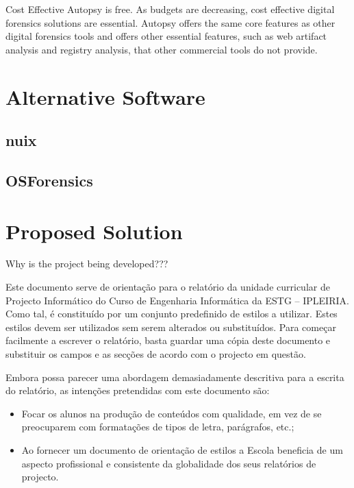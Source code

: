 Cost Effective
Autopsy is free. As budgets are decreasing, cost effective digital forensics solutions are essential. Autopsy offers the same core features as other digital forensics tools and offers other essential features, such as web artifact analysis and registry analysis, that other commercial tools do not provide.

\section{Alternative Software}


\subsection{nuix}


\subsection{OSForensics}


\section{Proposed Solution}

Why is the project being developed???

\pagebreak

Este documento serve de orientação para o relatório da unidade curricular de Projecto Informático do Curso de Engenharia Informática da ESTG – IPLEIRIA. Como tal, é constituído por um conjunto predefinido de estilos a utilizar. Estes estilos devem ser utilizados sem serem alterados ou substituídos. Para começar facilmente a escrever o relatório, basta guardar uma cópia deste documento e substituir os campos e as secções de acordo com o projecto em questão.

Embora possa parecer uma abordagem demasiadamente descritiva para a escrita do relatório, as intenções pretendidas com este documento são:

\begin{itemize}
 \item Focar os alunos na produção de conteúdos com qualidade, em vez de se preocuparem com formatações de tipos de letra, parágrafos, etc.;
 \item Ao fornecer um documento de orientação de estilos a Escola beneficia de um aspecto profissional e consistente da globalidade dos seus relatórios de projecto.
\end{itemize}



